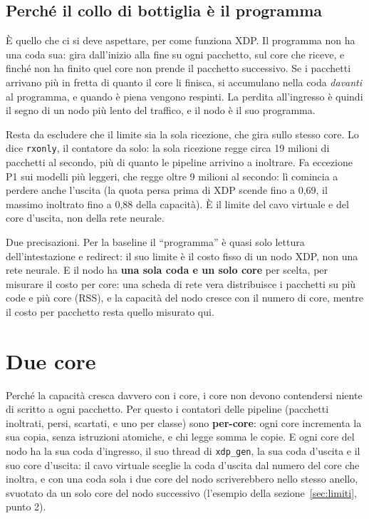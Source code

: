 \documentclass[11pt,a4paper,oneside]{report}
\begin{document}
\subsection*{Perché il collo di bottiglia è il programma}

È quello che ci si deve aspettare, per come funziona XDP. Il programma non ha una
coda sua: gira dall'inizio alla fine su ogni pacchetto, sul core che riceve, e
finché non ha finito quel core non prende il pacchetto successivo. Se i pacchetti
arrivano più in fretta di quanto il core li finisca, si accumulano nella coda
\emph{davanti} al programma, e quando è piena vengono respinti. La perdita
all'ingresso è quindi il segno di un nodo più lento del traffico, e il nodo è il
suo programma.

Resta da escludere che il limite sia la sola ricezione, che gira sullo stesso
core. Lo dice \texttt{rxonly}, il contatore da solo: la sola ricezione regge
circa 19 milioni di pacchetti al secondo, più di quanto le pipeline arrivino a
inoltrare. Fa eccezione P1 sui modelli più leggeri, che regge oltre 9 milioni al
secondo: lì comincia a perdere anche l'uscita (la quota persa prima di XDP scende
fino a 0,69, il massimo inoltrato fino a 0,88 della capacità). È il limite del
cavo virtuale e del core d'uscita, non della rete neurale.

Due precisazioni. Per la baseline il ``programma'' è quasi solo lettura
dell'intestazione e redirect: il suo limite è il costo fisso di un nodo XDP, non
una rete neurale. E il nodo ha \textbf{una sola coda e un solo core} per scelta,
per misurare il costo per core: una scheda di rete vera distribuisce i pacchetti
su più code e più core (RSS), e la capacità del nodo cresce con il numero di
core, mentre il costo per pacchetto resta quello misurato qui.

\section{Due core}
\label{sec:duecore}

Perché la capacità cresca davvero con i core, i core non devono contendersi
niente di scritto a ogni pacchetto. Per questo i contatori delle pipeline
(pacchetti inoltrati, persi, scartati, e uno per classe) sono \textbf{per-core}:
ogni core incrementa la sua copia, senza istruzioni atomiche, e chi legge somma
le copie. E ogni core del nodo ha la sua coda d'ingresso, il suo thread di
\texttt{xdp\_gen}, la sua coda d'uscita e il suo core d'uscita: il cavo virtuale
sceglie la coda d'uscita dal numero del core che inoltra, e con una coda sola i
due core del nodo scriverebbero nello stesso anello, svuotato da un solo core
del nodo successivo (l'esempio della sezione~\ref{sec:limiti}, punto 2).
\end{document}
